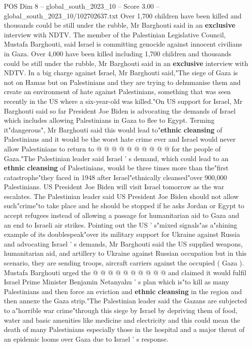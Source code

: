 \begin{textsample}{POS Dim 8 – global\_south\_2023\_10 – Score 3.00 – global\_south\_2023\_10/102702637.txt}  \label{ex:f8_pos_356}
Over 1,700 children have been killed and thousands could be still under the rubble, Mr Barghouti said in an \textbf{exclusive} interview with NDTV.
The member of the Palestinian Legislative Council, Mustafa Barghouti, said Israel is committing genocide against innocent civilians in Gaza.
Over 4,000 have been killed including 1,700 children and thousands could be still under the rubble, Mr Barghouti said in an \textbf{exclusive} interview with NDTV.
In a big charge against Israel, Mr Barghouti said,"The siege of Gaza is not on Hamas but on Palestinians and they are trying to dehumanise them and create an environment of hate against Palestinians, something that was seen recently in the US where a six-year-old was killed."On US support for Israel, Mr Barghouti said so far President Joe Biden is advocating the demands of Israel which includes allowing Palestinians in Gaza to flee to Egypt.
Terming it"dangerous", Mr Barghouti said this would lead to"\textbf{ethnic} \textbf{cleansing} of Palestinians and it would be the worst hate crime ever and Israel would never allow Palestinians to return to @ @ @ @ @ @ @ @ @ @ for the people of Gaza."The Palestinian leader said Israel ' s demand, which could lead to an \textbf{ethnic} \textbf{cleansing} of Palestinians, would be three times more than the"first catastrophe"they faced in 1948 after Israel"ethnically cleansed"over 900,000 Palestinians.
US President Joe Biden will visit Israel tomorrow as the war escalates.
The Palestinian leader said US President Joe Biden should not allow such"crime"to take place and he should be stopped if he asks Jordan or Egypt to accept refugees instead of allowing a passage for humanitarian aid to Gaza and an end to Israeli air strikes.
Pointing out the US ' s"mixed signals"as a"shining example of its doublespeak"over its military support for Ukraine against Russia and advocating Israel ' s demands, Mr Barghouti said the US supplied weapons, humanitarian aid, and artillery to Ukraine against Russian occupation but in this scenario, they are sending troops, aircraft carriers against the occupied ( Gaza ).
Mustafa Barghouti urged the @ @ @ @ @ @ @ @ @ @ and claimed it would fulfil Israel Prime Minister Benjamin Netanyahu ' s plan which is"to kill as many Palestinians and then force an eviction and \textbf{ethnic} \textbf{cleansing} in the region and then annexe the Gaza strip."The Palestinian leader said the Gazans are subjected to a"horrible war crime"through this siege by Israel by depriving them of food, water and basic amenities like medicine and electricity and this could mean the death of many Palestinians especially those in the hospital and a major threat of an epidemic looms over Gaza due to Israel ' s response.

\end{textsample}
